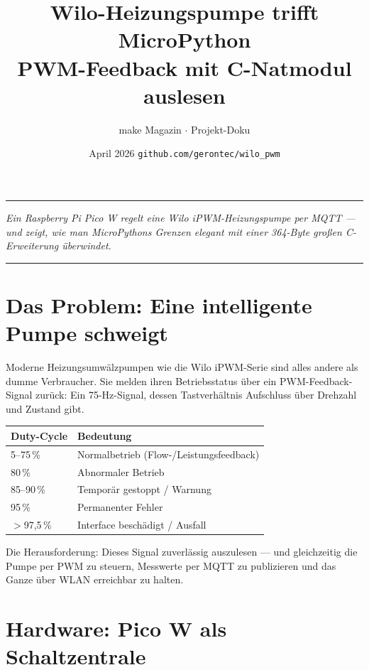 \documentclass[11pt,a4paper]{article}
\title{\textbf{Wilo-Heizungspumpe trifft MicroPython}\\[4pt]
  \large PWM-Feedback mit C-Natmodul auslesen}
\author{make Magazin $\cdot$ Projekt-Doku}
\date{April 2026 \quad \texttt{github.com/gerontec/wilo\_pwm}}
\begin{document}
\maketitle
\thispagestyle{empty}

\noindent\rule{\textwidth}{0.4pt}
\begin{center}
\textit{Ein Raspberry Pi Pico W regelt eine Wilo iPWM-Heizungspumpe per MQTT ---
und zeigt, wie man MicroPythons Grenzen elegant mit einer 364-Byte großen
C-Erweiterung überwindet.}
\end{center}
\noindent\rule{\textwidth}{0.4pt}

\bigskip

\section{Das Problem: Eine intelligente Pumpe schweigt}

Moderne Heizungsumwälzpumpen wie die Wilo iPWM-Serie sind alles andere als
dumme Verbraucher. Sie melden ihren Betriebsstatus über ein PWM-Feedback-Signal
zurück: Ein 75-Hz-Signal, dessen Tastverhältnis Aufschluss über Drehzahl und
Zustand gibt.

\begin{center}
\begin{tabular}{ll}
\toprule
\textbf{Duty-Cycle} & \textbf{Bedeutung} \\
\midrule
5--75\,\%  & Normalbetrieb (Flow-/Leistungsfeedback) \\
80\,\%     & Abnormaler Betrieb \\
85--90\,\% & Temporär gestoppt / Warnung \\
95\,\%     & Permanenter Fehler \\
$>$97,5\,\% & Interface beschädigt / Ausfall \\
\bottomrule
\end{tabular}
\end{center}

Die Herausforderung: Dieses Signal zuverlässig auszulesen --- und gleichzeitig
die Pumpe per PWM zu steuern, Messwerte per MQTT zu publizieren und das Ganze
über WLAN erreichbar zu halten.

\section{Hardware: Pico W als Schaltzentrale}
\end{document}
